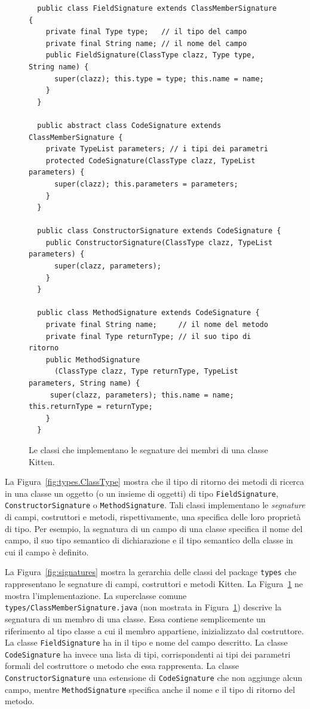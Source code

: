 \begin{figure}[t]
{\small
\begin{verbatim}
  public class FieldSignature extends ClassMemberSignature {
    private final Type type;   // il tipo del campo
    private final String name; // il nome del campo
    public FieldSignature(ClassType clazz, Type type, String name) {
      super(clazz); this.type = type; this.name = name;
    }
  }

  public abstract class CodeSignature extends ClassMemberSignature {
    private TypeList parameters; // i tipi dei parametri
    protected CodeSignature(ClassType clazz, TypeList parameters) {
      super(clazz); this.parameters = parameters;
    }
  }

  public class ConstructorSignature extends CodeSignature {
    public ConstructorSignature(ClassType clazz, TypeList parameters) {
      super(clazz, parameters);
    }
  }

  public class MethodSignature extends CodeSignature {
    private final String name;     // il nome del metodo
    private final Type returnType; // il suo tipo di ritorno
    public MethodSignature
      (ClassType clazz, Type returnType, TypeList parameters, String name) {
     super(clazz, parameters); this.name = name; this.returnType = returnType;
    }
  }
\end{verbatim}
}
\caption{Le classi che implementano le segnature dei membri di una classe Kitten.}
  \label{fig:members_signatures}
\end{figure}

La Figura~\ref{fig:types.ClassType} mostra che il tipo di ritorno dei metodi
di ricerca in una classe \e un oggetto (o un insieme di oggetti) di tipo
\texttt{FieldSignature}, \texttt{ConstructorSignature} o
\texttt{MethodSignature}. Tali classi implementano le \emph{segnature} di
campi, costruttori e metodi, rispettivamente, \cioe una specifica delle
loro propriet\`a di tipo. Per esempio, la segnatura di un campo di una classe
specifica il nome del campo, il suo tipo semantico di dichiarazione e
il tipo semantico della classe in cui il campo \`e definito.

La Figura~\ref{fig:signatures} mostra la gerarchia delle
classi del package \texttt{types}
che rappresentano le segnature di campi, costruttori e metodi Kitten.
La Figura~\ref{fig:members_signatures} ne mostra l'implementazione. La
superclasse comune \texttt{types/ClassMemberSignature.java} (non mostrata in
Figura~\ref{fig:members_signatures}) descrive
la segnatura di un membro di una classe. Essa contiene semplicemente un
riferimento al tipo classe a cui il membro appartiene, inizializzato
dal costruttore. La classe \texttt{FieldSignature}
ha in \piu il tipo e nome del campo descritto. La classe
\texttt{CodeSignature} ha invece una lista di tipi, corrispondenti
ai tipi dei parametri formali del costruttore o metodo
che essa rappresenta. La classe \texttt{ConstructorSignature}
\e una estensione di \texttt{CodeSignature} che non aggiunge alcun
campo, mentre \texttt{MethodSignature} specifica anche il nome e il tipo di
ritorno del metodo.
%
